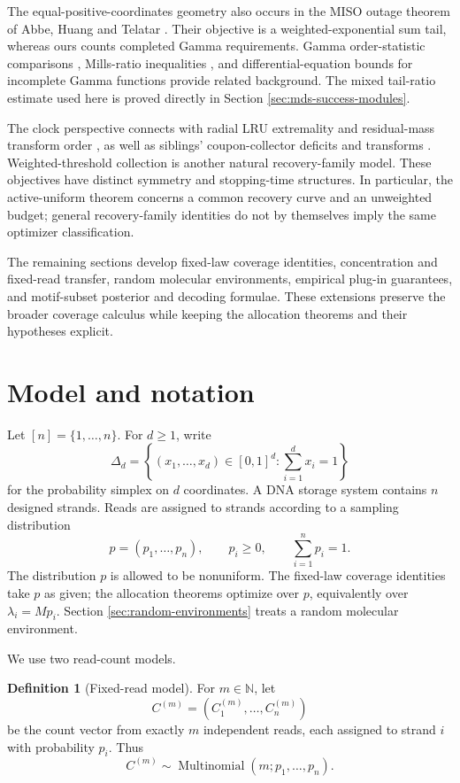\documentclass[11pt]{article}
\theoremstyle{definition}
\newtheorem{definition}{Definition}
\theoremstyle{remark}
\DeclareMathOperator{\Multinomial}{Multinomial}
\newcommand{\N}{\mathbb N}
\newcommand{\1}{\mathbf 1}
\begin{document}
The equal-positive-coordinates geometry also occurs in the MISO outage theorem of Abbe, Huang and Telatar \cite{Abbe2013}. Their objective is a weighted-exponential sum tail, whereas ours counts completed Gamma requirements. Gamma order-statistic comparisons \cite{SunZhang2004}, Mills-ratio inequalities \cite{Baricz2012}, and differential-equation bounds for incomplete Gamma functions \cite{Segura2014} provide related background. The mixed tail-ratio estimate used here is proved directly in Section \ref{sec:mds-success-modules}.

The clock perspective connects with radial LRU extremality and residual-mass transform order \cite{LongLRU2026,LongRank2026}, as well as siblings' coupon-collector deficits and transforms \cite{Doumas2026,LongSiblings2026,LongTransforms2026}. Weighted-threshold collection \cite{Muller2026} is another natural recovery-family model. These objectives have distinct symmetry and stopping-time structures. In particular, the active-uniform theorem concerns a common recovery curve and an unweighted budget; general recovery-family identities do not by themselves imply the same optimizer classification.

The remaining sections develop fixed-law coverage identities, concentration and fixed-read transfer, random molecular environments, empirical plug-in guarantees, and motif-subset posterior and decoding formulae. These extensions preserve the broader coverage calculus while keeping the allocation theorems and their hypotheses explicit.

\section{Model and notation}

Let \([n]=\{1,\ldots,n\}\).  For \(d\ge1\), write
\[
  \Delta_d=\left\{(x_1,\ldots,x_d)\in[0,1]^d:\sum_{i=1}^d x_i=1\right\}
\]
for the probability simplex on \(d\) coordinates.  A DNA storage system contains \(n\) designed strands.  Reads are assigned to strands according to a sampling distribution
\[
  p=(p_1,\ldots,p_n),\qquad p_i\ge 0,
  \qquad \sum_{i=1}^n p_i=1.
\]
The distribution \(p\) is allowed to be nonuniform. The fixed-law coverage identities take \(p\) as given; the allocation theorems optimize over \(p\), equivalently over \(\lambda_i=Mp_i\). Section \ref{sec:random-environments} treats a random molecular environment.

We use two read-count models.

\begin{definition}[Fixed-read model]
For \(m\in \N\), let
\[
  C^{(m)}=(C_1^{(m)},\ldots,C_n^{(m)})
\]
be the count vector from exactly \(m\) independent reads, each assigned to strand \(i\) with probability \(p_i\).  Thus
\[
  C^{(m)}\sim \Multinomial(m;p_1,\ldots,p_n).
\]
\end{definition}
\end{document}
